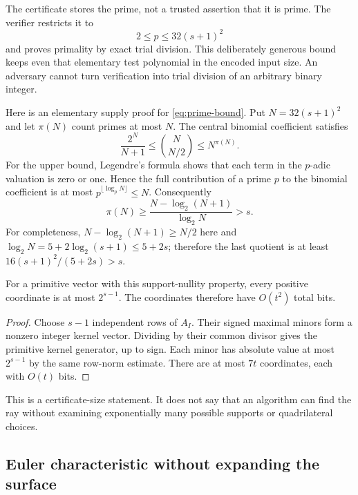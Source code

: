 The certificate stores the prime, not a trusted assertion that it is prime.
The verifier restricts it to
\begin{equation}
 2\leq p\leq 32(s+1)^2
 \label{eq:prime-bound}
\end{equation}
and proves primality by exact trial division. This deliberately generous
bound keeps even that elementary test polynomial in the encoded input size.
An adversary cannot turn verification into trial division of an arbitrary
binary integer.

Here is an elementary supply proof for \eqref{eq:prime-bound}. Put
$N=32(s+1)^2$ and let $\pi(N)$ count primes at most $N$. The central
binomial coefficient satisfies
\[
 \frac{2^N}{N+1}\leq \binom{N}{N/2}\leq N^{\pi(N)}.
\]
For the upper bound, Legendre's formula shows that each term in the
$p$-adic valuation is zero or one. Hence the full contribution of a prime
$p$ to the binomial coefficient is at most
$p^{\lfloor\log_pN\rfloor}\leq N$. Consequently
\[
 \pi(N)\geq\frac{N-\log_2(N+1)}{\log_2N}>s.
\]
For completeness, $N-\log_2(N+1)\geq N/2$ here and
$\log_2N=5+2\log_2(s+1)\leq5+2s$; therefore the last quotient is at
least $16(s+1)^2/(5+2s)>s$.

\begin{corollary}
\label{cor:coordinate-size}
For a primitive vector with this support-nullity property,
every positive coordinate is at most $2^{s-1}$. The coordinates therefore
have $O(t^2)$ total bits.
\end{corollary}
\begin{proof}
Choose $s-1$ independent rows of $A_I$. Their signed maximal minors form
a nonzero integer kernel vector. Dividing by their common divisor gives
the primitive kernel generator, up to sign. Each minor has absolute value
at most $2^{s-1}$ by the same row-norm estimate. There are at most $7t$
coordinates, each with $O(t)$ bits.
\end{proof}

This is a certificate-size statement. It does not say that an algorithm can
find the ray without examining exponentially many possible supports or
quadrilateral choices.

\subsection{Euler characteristic without expanding the surface}

